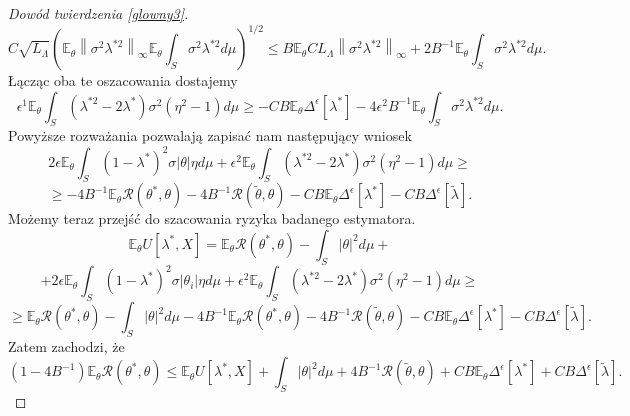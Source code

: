 \documentclass{article}
\newcommand{\norm}[1]{\left\lVert#1\right\rVert}
\begin{document}
\begin{proof}[Dowód twierdzenia \ref{glowny3}]
\begin{displaymath}
C\sqrt{L_{\Lambda}}\left(\mathbb{E}_{\theta}\norm{\sigma^2\lambda^{*2}}_{\infty}\mathbb{E}_{\theta}\int_S\sigma^2\lambda^{*2}d\mu\right)^{1/2}
\leq B\mathbb{E}_{\theta}CL_{\Lambda}\norm{\sigma^2\lambda^{*2}}_{\infty}+2B^{-1}\mathbb{E}_{\theta}\int_S\sigma^2\lambda^{*2}d\mu.
\end{displaymath}
Łącząc oba te oszacowania dostajemy
\begin{displaymath}
\epsilon^1\mathbb{E}_{\theta}\int_S(\lambda^{*2}-2\lambda^*)\sigma^2(\eta^2-1)d\mu\geq
-CB\mathbb{E}_{\theta}\Delta^{\epsilon}[\lambda^*]-4\epsilon^2B^{-1}\mathbb{E}_{\theta}\int_S\sigma^2\lambda^{*2}d\mu.
\end{displaymath}
Powyższe rozważania pozwalają zapisać nam następujący wniosek
\begin{displaymath}
2\epsilon\mathbb{E}_{\theta}\int_S(1-\lambda^*)^2\sigma |\theta |\eta d\mu+\epsilon^2\mathbb{E}_{\theta}\int_S(\lambda^{*2}-2\lambda^*)\sigma^2(\eta^2-1)d\mu\geq
\end{displaymath}
\begin{displaymath}
\geq -4B^{-1}\mathbb{E}_{\theta}\mathcal{R}(\theta^*,\theta)-4B^{-1}\mathcal{R}(\tilde{\theta},\theta)-CB\mathbb{E}_{\theta}\Delta^{\epsilon}[\lambda^*]-CB\Delta^{\epsilon}[\tilde{\lambda}].
\end{displaymath}
Możemy teraz przejść do szacowania ryzyka badanego estymatora.
\begin{displaymath}
\mathbb{E}_{\theta}U[\lambda^*,X]=\mathbb{E}_{\theta}\mathcal{R}(\theta^*,\theta)-\int_S|\theta |^2d\mu+
\end{displaymath}
\begin{displaymath}
+2\epsilon\mathbb{E}_{\theta}\int_S(1-\lambda^*)^2\sigma |\theta_i |\eta d\mu+\epsilon^2\mathbb{E}_{\theta}\int_S(\lambda^{*2}-2\lambda^*)\sigma^2(\eta^2-1)d\mu \geq
\end{displaymath}
\begin{displaymath}
\geq \mathbb{E}_{\theta}\mathcal{R}(\theta^*,\theta)-\int_S|\theta |^2d\mu-4B^{-1}\mathbb{E}_{\theta}\mathcal{R}(\theta^*,\theta)-4B^{-1}\mathcal{R}(\tilde{\theta},\theta)-CB\mathbb{E}_{\theta}\Delta^{\epsilon}[\lambda^*]-CB\Delta^{\epsilon}[\tilde{\lambda}].
\end{displaymath}
Zatem zachodzi, że
\begin{displaymath}
(1-4B^{-1})\mathbb{E}_{\theta}\mathcal{R}(\theta^*,\theta)\leq \mathbb{E}_{\theta}U[\lambda^*,X]+\int_S|\theta |^2d\mu+4B^{-1}\mathcal{R}(\tilde{\theta},\theta)+CB\mathbb{E}_{\theta}\Delta^{\epsilon}[\lambda^*]+CB\Delta^{\epsilon}[\tilde{\lambda}].

\end{displaymath}
\end{proof}
\end{document}
